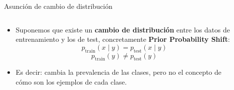 \documentclass{beamer}
\begin{document}
\begin{frame}{Asunción de cambio de distribución}
\begin{columns}
    \begin{column}{0.5\textwidth}
        \begin{itemize}
            \item Suponemos que existe un \textbf{cambio de distribución} entre los datos de entrenamiento y los de test, concretamente \textbf{Prior Probability Shift}:
            \begin{equation}
                p_{\text{train}}(x \mid y) = p_{\text{test}}(x \mid y)
            \end{equation}
            \begin{equation}
                p_{\text{train}}(y) \neq p_{\text{test}}(y)
            \end{equation}
            \item Es decir: cambia la prevalencia de las clases, pero no el concepto de cómo son los ejemplos de cada clase.
        \end{itemize}
    \end{column}
    \begin{column}{0.1\textwidth}
    \end{column}
    \begin{column}{0.4\textwidth}
        \centering

\end{column}
\end{columns}
\end{frame}
\end{document}

